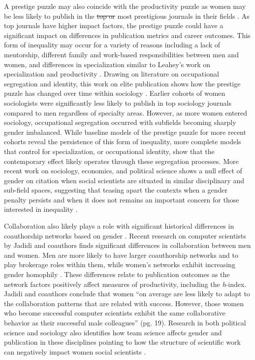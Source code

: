 \documentclass[
  10pt,
  letterpaper,
]{article}
\providecommand{\DIFdeltex}[1]{{\protect\color{red}\sout{#1}}}                      %
\providecommand{\DIFdelbegin}{} %
\providecommand{\DIFdelend}{} %
\providecommand{\DIFdel}[1]{\texorpdfstring{\DIFdeltex{#1}}{}} %
\newcommand{\DIFscaledelfig}{0.5}
\newlength{\DIFdelgraphicswidth} %
\newlength{\DIFdelgraphicsheight} %
\newcommand{\DIFdelincludegraphics}[2][]{%
\sbox{\DIFdelgraphicsbox}{\DIFOincludegraphics[#1]{#2}}%
\settoboxwidth{\DIFdelgraphicswidth}{\DIFdelgraphicsbox} %
\settoboxtotalheight{\DIFdelgraphicsheight}{\DIFdelgraphicsbox} %
\scalebox{\DIFscaledelfig}{%
\parbox[b]{\DIFdelgraphicswidth}{\usebox{\DIFdelgraphicsbox}\\[-\baselineskip] \rule{\DIFdelgraphicswidth}{0em}}\llap{\resizebox{\DIFdelgraphicswidth}{\DIFdelgraphicsheight}{%
\setlength{\unitlength}{\DIFdelgraphicswidth}%
\begin{picture}(1,1)%
\thicklines\linethickness{2pt} %
{\color[rgb]{1,0,0}\put(0,0){\framebox(1,1){}}}%
{\color[rgb]{1,0,0}\put(0,0){\line( 1,1){1}}}%
{\color[rgb]{1,0,0}\put(0,1){\line(1,-1){1}}}%
\end{picture}%
}\hspace*{3pt}}} %
} %
\DeclareRobustCommand{\DIFdelbegin}{\DIFOdelbegin \let\includegraphics\DIFdelincludegraphics} %
\DeclareRobustCommand{\DIFdelend}{\DIFOaddend \let\includegraphics\DIFOincludegraphics} %
\begin{document}
A prestige puzzle may also coincide with the productivity puzzle as
women may be less likely to publish in the \DIFdelbegin \DIFdel{top or }\DIFdelend most prestigious journals in
their fields \citep{light_gender_2013}. As top journals have higher
impact factors, the prestige puzzle could have a significant impact on
differences in publication metrics and career outcomes. This form of
inequality may occur for a variety of reasons including a lack of
mentorship, different family and work-based responsibilities between men
and women, and differences in specialization similar to Leahey's work on
specialization and productivity
\citep{leahey_gender_2006, leahey_not_2007, light_gender_2009}. Drawing
on literature on occupational segregation and identity, this work on
elite publication shows how the prestige puzzle has changed over time
within sociology \citep{light_gender_2009}. Earlier cohorts of women
sociologists were significantly less likely to publish in top sociology
journals compared to men regardless of specialty areas. However, as more
women entered sociology, occupational segregation occurred with
subfields becoming sharply gender imbalanced. While baseline models of
the prestige puzzle for more recent cohorts reveal the persistence of
this form of inequality, more complete models that control for
specialization, or occupational identity, show that the contemporary
effect likely operates through these segregation processes. More recent
work on sociology, economics, and political science shows a null effect
of gender on citation when social scientists are situated in similar
disciplinary and sub-field spaces, suggesting that teasing apart the
contexts when a gender penalty persists and when it does not remains an
important concern for those interested in inequality
\citep{lynn_rare_2019}.

Collaboration also likely plays a role with significant historical
differences in coauthorship networks based on gender
\citep{moody_structure_2004}. Recent research on computer scientists by
Jadidi and coauthors finds significant differences in collaboration
between men and women. Men are more likely to have larger coauthorship
networks and to play brokerage roles within them, while women's networks
exhibit increasing gender homophily \citep{jadidi_gender_2018}. These
differences relate to publication outcomes as the network factors
positively affect measures of productivity, including the
\emph{h}-index. Jadidi and coauthors conclude that women ``on average
are less likely to adapt to the collaboration patterns that are related
with success. However, those women who become successful computer
scientists exhibit the same collaborative behavior as their successful
male colleagues'' (pg. 19). Research in both political science and
sociology also identifies how team science affects gender and
publication in these disciplines pointing to how the structure of
scientific work can negatively impact women social scientists
\citep{akbaritabar_gender_2021, teele_gender_2017}.
\end{document}
